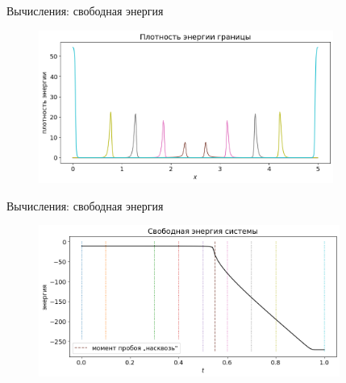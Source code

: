 \begin{frame}{Вычисления: свободная энергия}
\vspace{-0.6cm}
\begin{figure}
	\includegraphics[width=0.86\textwidth]{figures/density_surface.png}
\end{figure}
\end{frame}


\begin{frame}{Вычисления: свободная энергия}
\vspace{-0.6cm}
\begin{figure}
	\includegraphics[width=0.88\textwidth]{figures/energy_total.png}
\end{figure}
\end{frame}